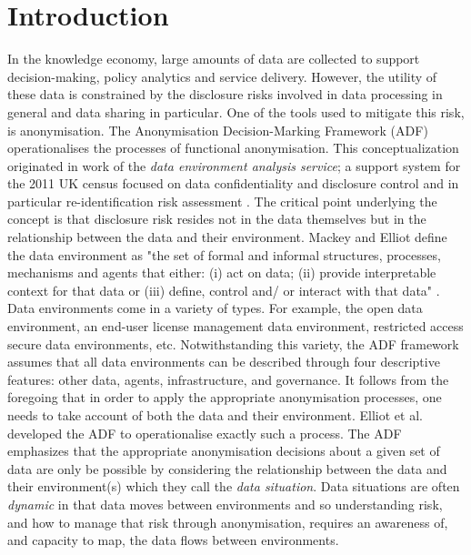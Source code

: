 \section{Introduction}
In the knowledge economy, large amounts of data are collected to support decision-making, policy analytics and service delivery. However, the utility of these data is constrained by the disclosure risks involved in data processing in general and data sharing in particular. One of the tools used to mitigate this risk,  is anonymisation.  The Anonymisation Decision-Marking Framework (ADF) operationalises the processes of functional anonymisation\cite{elliot2018functional}. 
This conceptualization originated in work of the \textit{data environment analysis service}\cite{elliot2010data}; a support system for the 2011 UK census focused on data confidentiality and  disclosure control \cite[e.g.][]{willenborg2012elements,duncan2011concepts,hundepool2012SDC} and in particular re-identification risk assessment \cite [e.g.][]{chen1998, skinner1998estimating,skinner2002measure}. The critical point underlying the concept is that disclosure risk resides not in the data themselves but in the relationship between the data and their environment.  Mackey and Elliot define the data environment as "the set of formal and informal structures, processes, mechanisms and agents that either: (i) act on data; (ii) provide interpretable context for that data or (iii) define, control and/ or interact with that data" \cite{mackey2013understanding}. Data environments come in a variety of types. For example, the open data environment, an end-user license management data environment, restricted access secure data environments, etc. Notwithstanding this variety, the ADF framework assumes that all data environments can be described through four descriptive features: other data, agents, infrastructure, and governance. 
It follows from the foregoing that in order to apply the appropriate anonymisation processes, one needs to take account of both the data and their environment. Elliot et al. \cite{elliot2020anonymisation} developed the ADF to operationalise exactly such a process. The ADF emphasizes that the appropriate anonymisation decisions about a given set of data are only be possible by considering the relationship between the data and their environment(s) which they call the \textit{data situation}.  Data situations are often \textit{dynamic} in that data moves between environments and so understanding risk, and how to manage that risk through anonymisation, requires an awareness of, and capacity to map, the data flows between environments. 

